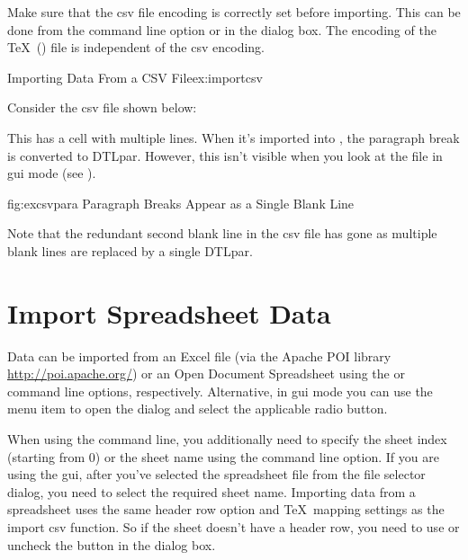    Make sure that the \gls{csv} file encoding is correctly set
   before importing. This can be done from the 
   command line option or in the 
    dialog box. The encoding
   of the \TeX\ () file is independent of the \gls{csv}
   encoding.

\begin{example}{Importing Data From a CSV File}{ex:importcsv}

   Consider the \gls{csv} file shown below:


   This has a cell with multiple lines. When it's imported into
   , the paragraph break is converted to \gls{DTLpar}.
   However, this isn't visible when you look at the file in 
   \gls{gui} mode (see ).

\FloatFig
 {fig:excsvpara}
 {%
 }
 {Paragraph Breaks Appear as a Single Blank Line}

   Note that the redundant second blank line in the \gls{csv} file
   has gone as multiple blank lines are replaced by a single
   \gls{DTLpar}.
\end{example}

\section{Import Spreadsheet Data}\label{sec:importspread}

   Data can be imported from an Excel  file (via the 
   Apache POI library \url{http://poi.apache.org/})
   or an Open Document Spreadsheet using the
    or  command line options, respectively.
   Alternative, in \gls{gui} mode you can use the 
    menu item to open the  dialog
   and select the applicable radio button.

 When using the command line,
   you additionally need to specify the sheet index (starting from 0) or the 
   sheet name using the  command line option. If you are 
   using the \gls{gui}, after you've selected the spreadsheet file 
   from the file selector dialog, you need to select the required sheet 
   name.
Importing data from a spreadsheet uses the same header row option and 
   \TeX\ mapping settings as the import \gls{csv} function. 
   So if the sheet doesn't have a header row, you need to use
    or uncheck the
 button 
   in the  dialog box.


